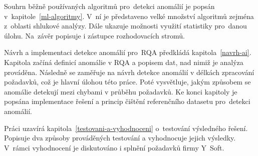 Souhrn běžně používaných algoritmů pro~detekci anomálií je popsán v~kapitole~\ref{ml-algoritmy}. V~ní je představeno velké množství algoritmů zejména z~oblasti shlukové analýzy. Dále ukazuje možnosti využití statistiky pro~danou úlohu. Na~závěr popisuje i zástupce rozhodovacích stromů.

Návrh a implementaci detekce anomálií pro~RQA předkládá kapitola~\ref{navrh-ai}. Kapitola začíná definicí anomálie v RQA a popisem dat, nad nimiž je analýza prováděna. Následně se zaměřuje na návrh detekce anomálií v délkách zpracování požadavků, což je hlavní úlohou této práce. Poté vysvětluje, jakým způsobem se anomálie detekují mezi chybami v průběhu požadavků. Ke konci kapitoly je popsána implementace řešení a princip čištění referenčního datasetu pro~detekci anomálií.

Práci uzavírá kapitola~\ref{testovani-a-vyhodnoceni} o~testování výsledného řešení. Popisuje dva způsoby prováděných testování a vyhodnocuje jejich výsledky. V~rámci vyhodnocení je diskutováno i splnění požadavků firmy Y~Soft.